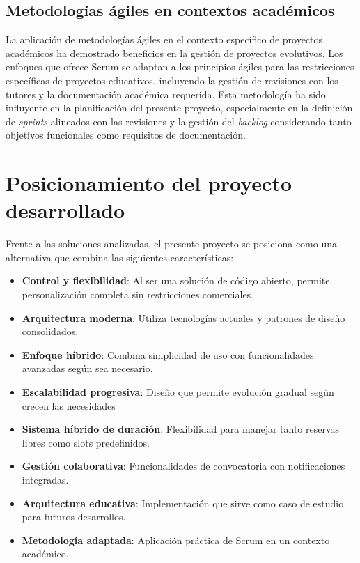 \subsection{Metodologías ágiles en contextos académicos}\label{metodologias-agiles-contextos-academicos}
La aplicación de metodologías ágiles en el contexto específico de proyectos académicos ha demostrado beneficios en la gestión de proyectos evolutivos. Los enfoques que ofrece Scrum se adaptan a los principios ágiles para las restricciones específicas de proyectos educativos, incluyendo la gestión de revisiones con los tutores y la documentación académica requerida. Esta metodología ha sido influyente en la planificación del presente proyecto, especialmente en la definición de \emph{sprints} alineados con las revisiones y la gestión del \emph{backlog} considerando tanto objetivos funcionales como requisitos de documentación.

\section{Posicionamiento del proyecto desarrollado}\label{posicionamiento-proyecto-desarrollado}
Frente a las soluciones analizadas, el presente proyecto se posiciona como una alternativa que combina las siguientes características:

\begin{itemize}
\tightlist
\item
\textbf{Control y flexibilidad}: Al ser una solución de código abierto, permite personalización completa sin restricciones comerciales.
\item
\textbf{Arquitectura moderna}: Utiliza tecnologías actuales y patrones de diseño consolidados.
\item
\textbf{Enfoque híbrido}: Combina simplicidad de uso con funcionalidades avanzadas según sea necesario.
\item
\textbf{Escalabilidad progresiva}: Diseño que permite evolución gradual según crecen las necesidades
\item
\textbf{Sistema híbrido de duración}: Flexibilidad para manejar tanto reservas libres como slots predefinidos.
\item
\textbf{Gestión colaborativa}: Funcionalidades de convocatoria con notificaciones integradas.
\item
\textbf{Arquitectura educativa}: Implementación que sirve como caso de estudio para futuros desarrollos.
\item
\textbf{Metodología adaptada}: Aplicación práctica de Scrum en un contexto académico.
\end{itemize}

